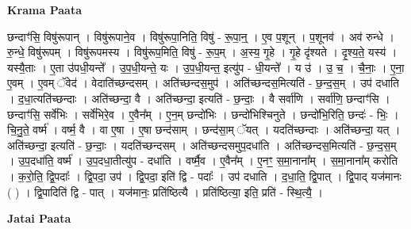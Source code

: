 \documentclass[17pt]{extarticle}
\begin{document}
\textbf{Krama Paata} \newline

छन्दाꣳ॑सि॒ विषु॑रूपान् । विषु॑रूपाने॒व । विषु॑रूपा॒निति॒ विषु॑ - रू॒पा॒न्॒ । ए॒व प॒शून् । प॒शूनव॑ । अव॑ रुन्धे । रु॒न्धे॒ विषु॑रूपम् । विषु॑रूपमस्य । विषु॑रूप॒मिति॒ विषु॑ - रू॒प॒म् । अ॒स्य॒ गृ॒हे । गृ॒हे दृ॑श्यते । दृ॒श्य॒ते॒ यस्य॑ । यस्यै॒ताः । ए॒ता उ॑पधी॒यन्ते᳚ । उ॒प॒धी॒यन्ते॒ यः । उ॒प॒धी॒यन्त॒ इत्यु॑प - धी॒यन्ते᳚ । य उ॑ । उ॒ च॒ । चै॒नाः॒ । ए॒ना॒ ए॒वम् । ए॒वम् ॅवेद॑ । वेदाति॑च्छन्दसम् । अति॑च्छन्दस॒मुप॑ । अति॑च्छन्दस॒मित्यति॑ - छ॒न्द॒स॒म् । उप॑ दधाति । द॒धा॒त्यति॑च्छन्दाः । अति॑च्छन्दा॒ वै । अति॑च्छन्दा॒ इत्यति॑ - छ॒न्दाः॒ । वै सर्वा॑णि । सर्वा॑णि॒ छन्दाꣳ॑सि । छन्दाꣳ॑सि॒ सर्वे॑भिः । सर्वे॑भिरे॒व । ए॒वैन᳚म् । ए॒न॒म् छन्दो॑भिः । छन्दो॑भिश्चिनुते । छन्दो॑भि॒रिति॒ छन्दः॑ - भिः॒ । चि॒नु॒ते॒ वर्ष्म॑ । वर्ष्म॒ वै । वा ए॒षा । ए॒षा छन्द॑साम् । छन्द॑सा॒म् ॅयत् । यदति॑च्छन्दाः । अति॑च्छन्दा॒ यत् । अति॑च्छन्दा॒ इत्यति॑ - छ॒न्दाः॒ । यदति॑च्छन्दसम् । अति॑च्छन्दसमुप॒दधा॑ति । अति॑च्छन्दस॒मित्यति॑ - छ॒न्द॒स॒म् । उ॒प॒दधा॑ति॒ वर्ष्म॑ । उ॒प॒दधा॒तीत्यु॑प - दधा॑ति । वर्ष्मै॒व । ए॒वैन᳚म् । ए॒नꣳ॒॒ स॒मा॒नाना᳚म् । स॒मा॒नाना᳚म् करोति । क॒रो॒ति॒ द्वि॒पदाः᳚ । द्वि॒पदा॒ उप॑ । द्वि॒पदा॒ इति॑ द्वि - पदाः᳚ । उप॑ दधाति । द॒धा॒ति॒ द्वि॒पात् । द्वि॒पाद् यज॑मानः ( ) । द्वि॒पादिति॑ द्वि - पात् । यज॑मानः॒ प्रति॑ष्ठित्यै । प्रति॑ष्ठित्या॒ इति॒ प्रति॑ - स्थि॒त्यै॒ । \newline

\textbf{Jatai Paata} \newline
\end{document}
